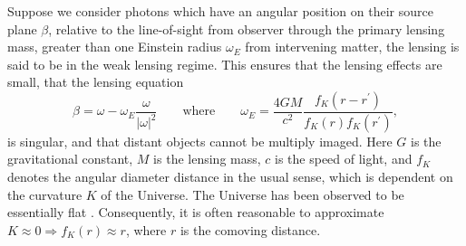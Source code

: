 \documentclass[fleqn,usenatbib]{mnras}
\begin{document}
Suppose we consider photons which have an angular position on their source plane $\beta$, relative to the line-of-sight from observer through the primary lensing mass, greater than one Einstein radius $\omega_E$ from intervening matter, the lensing is said to be in the weak lensing regime. This ensures that the lensing effects are small, that the lensing equation 
\begin{equation}
	\beta = \omega - \omega_E \frac{\omega}{|\omega|^2}
	\qquad \text{where} \qquad
	\omega_E = \frac{4GM}{c^2} \frac{f_K(r-r^\prime)}{f_K(r)f_K(r^\prime)},
\end{equation}
is singular, and that distant objects cannot be multiply imaged. Here $G$ is the gravitational constant, $M$ is the lensing mass, $c$ is the speed of light, and $f_K$ denotes the angular diameter distance in the usual sense, which is dependent on the curvature $K$ of the Universe. The Universe has been observed to be essentially flat \citep{aghanim2020planck}. Consequently, it is often reasonable to approximate $K \approx 0 \Rightarrow f_K(r) \approx r$, where $r$ is the comoving distance. 
\end{document}
